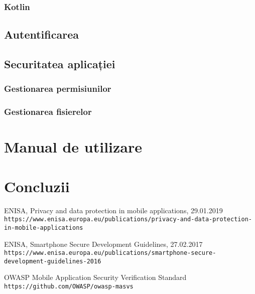 \documentclass[a4paper]{article}
\begin{document}
\subsubsection{Kotlin}
\subsection{Autentificarea}
\subsection{Securitatea aplicației}
\subsubsection{Gestionarea permisiunilor}
\subsubsection{Gestionarea fisierelor}

\section{Manual de utilizare}

\section{Concluzii}


\newpage

\begin{thebibliography}{9}

    ENISA,
    Privacy and data protection in mobile applications, 29.01.2019
    \\\texttt{https://www.enisa.europa.eu/publications/privacy-and-data-protection-in-mobile-applications}

    ENISA,
    Smartphone Secure Development Guidelines, 27.02.2017
    \\\texttt{https://www.enisa.europa.eu/publications/smartphone-secure-development-guidelines-2016}

    OWASP Mobile Application Security Verification Standard
    \\\texttt{https://github.com/OWASP/owasp-masvs}


\end{thebibliography}   
\end{document}
